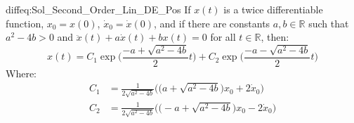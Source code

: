             \begin{ftheorem}{}{diffeq:Sol_Second_Order_Lin_DE_Pos}
                If $x(t)$ is a twice differentiable function,
                $x_{0}=x(0)$, $\dot{x}_{0}=\dot{x}(0)$, and if
                there are constants $a,b\in\mathbb{R}$ such that
                $a^{2}-4b>0$ and
                $\ddot{x}(t)+a\dot{x}(t)+bx(t)=0$ for all
                $t\in\mathbb{R}$, then:
                \begin{equation*}
                    x(t)=
                    C_{1}\exp\Big(\frac{-a+\sqrt{a^{2}-4b}}{2}t\Big)
                    +
                    C_{2}\exp\Big(\frac{-a-\sqrt{a^{2}-4b}}{2}t\Big)
                \end{equation*}
                Where:
                \begin{align*}
                    C_{1}&=
                    \frac{1}{2\sqrt{a^{2}-4b}}\Big(
                    \big(a+\sqrt{a^{2}-4b}\big)x_{0}+
                    2\dot{x}_{0}\Big)\\
                    C_{2}&=
                    \frac{1}{2\sqrt{a^{2}-4b}}\Big(
                    \big(-a+\sqrt{a^{2}-4b}\big)x_{0}-
                    2\dot{x}_{0}\Big)
                \end{align*}
            \end{ftheorem}
